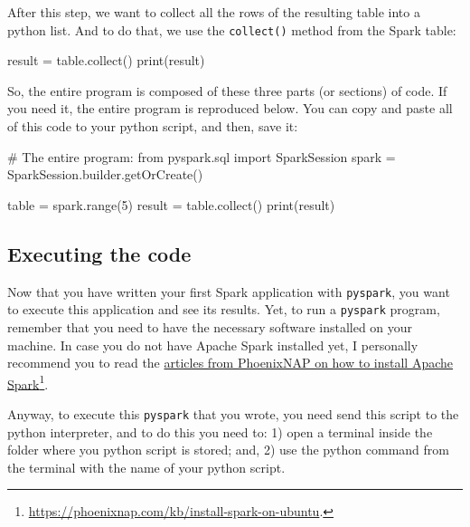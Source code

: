 \documentclass[
  11pt,
  letterpaper,
  DIV=11,
  numbers=noendperiod]{scrreprt}
\newenvironment{Shaded}{\begin{snugshade}}{\end{snugshade}}
\newcommand{\BuiltInTok}[1]{\textcolor[rgb]{0.00,0.23,0.31}{#1}}
\newcommand{\CommentTok}[1]{\textcolor[rgb]{0.37,0.37,0.37}{#1}}
\newcommand{\DecValTok}[1]{\textcolor[rgb]{0.68,0.00,0.00}{#1}}
\newcommand{\ImportTok}[1]{\textcolor[rgb]{0.00,0.46,0.62}{#1}}
\newcommand{\NormalTok}[1]{\textcolor[rgb]{0.00,0.23,0.31}{#1}}
\newcommand{\OperatorTok}[1]{\textcolor[rgb]{0.37,0.37,0.37}{#1}}
\begin{document}
After this step, we want to collect all the rows of the resulting table
into a python list. And to do that, we use the \texttt{collect()} method
from the Spark table:

\begin{Shaded}
\begin{Highlighting}[]
\NormalTok{result }\OperatorTok{=}\NormalTok{ table.collect()}
\BuiltInTok{print}\NormalTok{(result)}
\end{Highlighting}
\end{Shaded}

So, the entire program is composed of these three parts (or sections) of
code. If you need it, the entire program is reproduced below. You can
copy and paste all of this code to your python script, and then, save
it:

\begin{Shaded}
\begin{Highlighting}[]
\CommentTok{\# The entire program:}
\ImportTok{from}\NormalTok{ pyspark.sql }\ImportTok{import}\NormalTok{ SparkSession}
\NormalTok{spark }\OperatorTok{=}\NormalTok{ SparkSession.builder.getOrCreate()}

\NormalTok{table }\OperatorTok{=}\NormalTok{ spark.}\BuiltInTok{range}\NormalTok{(}\DecValTok{5}\NormalTok{)}
\NormalTok{result }\OperatorTok{=}\NormalTok{ table.collect()}
\BuiltInTok{print}\NormalTok{(result)}
\end{Highlighting}
\end{Shaded}

\subsection{Executing the code}\label{executing-the-code}

Now that you have written your first Spark application with
\texttt{pyspark}, you want to execute this application and see its
results. Yet, to run a \texttt{pyspark} program, remember that you need
to have the necessary software installed on your machine. In case you do
not have Apache Spark installed yet, I personally recommend you to read
the \href{https://phoenixnap.com/kb/install-spark-on-ubuntu}{articles
from PhoenixNAP on how to install Apache Spark}\footnote{\url{https://phoenixnap.com/kb/install-spark-on-ubuntu}.}.

Anyway, to execute this \texttt{pyspark} that you wrote, you need send
this script to the python interpreter, and to do this you need to: 1)
open a terminal inside the folder where you python script is stored;
and, 2) use the python command from the terminal with the name of your
python script.
\end{document}
